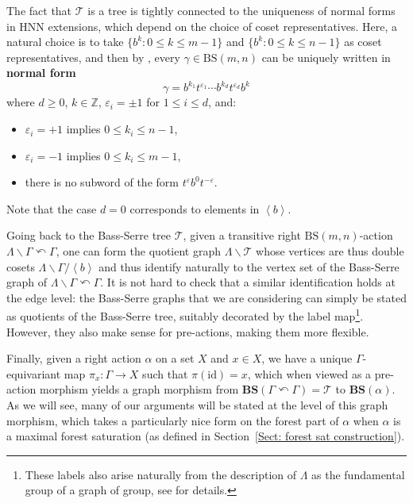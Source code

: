 \documentclass[12pt]{article}
\numberwithin{equation}{section}
\theoremstyle{definition}
\newcommand{\Z}{\mathbb{Z}}
\newcommand{\la}{\left\langle}
\newcommand{\ra}{\right\rangle}
\def\id{\mathrm{id}}
\newcommand\BSo{\mathrm{BS}}
\newcommand\BSe{\mathbf{BS}}
\newcommand\Tree{\mathcal{T}}
\newcommand{\bs}{\backslash}
\begin{document}
The fact that \(\mathcal T\) is a tree is tightly connected to the uniqueness of
normal forms in HNN extensions, which depend on the choice of coset representatives. 
Here, a natural choice is to take \(\{b^k\colon 0\leq k\leq m-1\}\)
and \(\{b^k\colon 0\leq k\leq n-1\}\)
as coset representatives, and then by \cite[Chapter IV, Theorem 2.1]{lyndon_combinatorial_2001}, every \(\gamma\in\BSo(m,n)\) can be uniquely written in \textbf{normal form}
\[
\gamma=b^{k_1}t^{\varepsilon_1}\cdots b^{k_d}t^{\varepsilon_d}b^k
\]
where \(d\geq 0\), \(k\in\Z\), \(\varepsilon_i=\pm 1\) for \(1\leq i\leq d\), and: 
\begin{itemize}
    \item $\varepsilon_i=+1$ implies $0\leq k_i\leq n-1$,
    \item $\varepsilon_i=-1$ implies $0\leq k_i\leq m-1$,
    \item there is no subword of the form $t^\varepsilon b^0t^{-\varepsilon}$.
\end{itemize}
Note that the case 
$d=0$ corresponds to elements in $\la b\ra$.

Going back to the Bass-Serre tree \(\Tree\),
given a transitive right
\(\BSo(m,n)\)-action \(\Lambda \bs \Gamma \curvearrowleft\Gamma \), one can form the quotient graph 
\(\Lambda\bs\Tree\) whose vertices are thus double cosets 
\(\Lambda\bs\Gamma /\la b\ra \) and thus identify naturally to the vertex set
of the Bass-Serre graph of \(\Lambda\bs\Gamma \curvearrowleft\Gamma\). It is not hard to check that a similar identification holds at the edge level: the Bass-Serre graphs 
that we are considering can simply be stated as quotients of the Bass-Serre tree, suitably 
decorated by the label map\footnote{These labels also arise naturally from the description of \(\Lambda\) as the fundamental group of a graph of group, see \cite[Proposition~2.9 and Proposition~3.34]{CGLMS-22} for details.}. However, they also make sense for pre-actions, making them more flexible. 


Finally, given a right action \(\alpha\) on a set \(X\) and \(x\in X\), we have a unique \(\Gamma\)-equivariant map \(\pi_x:\Gamma\to X\) such that \(\pi(\id)=x\), 
which when viewed as a pre-action morphism yields a graph morphism from 
\(\BSe(\Gamma\curvearrowleft\Gamma)=\Tree\) to \(\BSe(\alpha)\).
As we will see, many of our arguments will be stated at the level 
of this graph morphism, which takes a particularly nice form on the forest part of \(\alpha\) when \(\alpha\) is 
a maximal forest saturation (as defined in Section~\ref{Sect: forest sat construction}).
\end{document}
